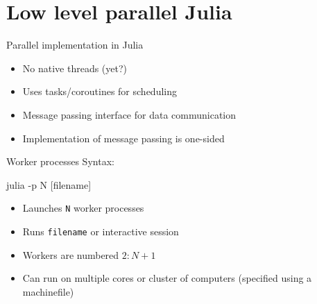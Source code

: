 \documentclass{beamer}
\begin{document}
%

	\section{Low level parallel Julia}

	\begin{frame}{Parallel implementation in Julia}
		\begin{itemize}
			\item{No native threads (yet?)}
			\item{Uses tasks/coroutines for scheduling}
			\item{Message passing interface for data communication}
			\item{Implementation of message passing is one-sided}
		\end{itemize}
	\end{frame}
	
	\begin{frame}[fragile]{Worker processes}
		Syntax:
		\begin{semiverbatim}
			julia -p N [filename]
		\end{semiverbatim}
		\begin{itemize}
			\item{Launches \verb+N+ worker processes}
			\item{Runs \verb+filename+ or interactive session}
			\item{Workers are numbered $2:N+1$}
			\item{Can run on multiple cores or cluster of computers (specified using a machinefile)}
		\end{itemize}
	\end{frame}
\end{document}
